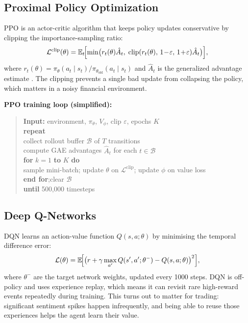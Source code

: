 \documentclass[letterpaper,twocolumn]{article}
\begin{document}
\subsection{Proximal Policy Optimization}

PPO \citep{schulman2017proximal} is an actor-critic algorithm
that keeps policy updates conservative by clipping the
importance-sampling ratio:
\begin{equation}
  \mathcal{L}^{\text{clip}}(\theta) =
    \mathbb{E}_t\!\Bigl[
      \min\bigl(
        r_t(\theta)\hat{A}_t,\;
        \mathrm{clip}(r_t(\theta),\, 1\!-\!\varepsilon,\,
                     1\!+\!\varepsilon)\hat{A}_t
      \bigr)
    \Bigr],
\end{equation}
where $r_t(\theta) = \pi_\theta(a_t\mid s_t) /
\pi_{\theta_\text{old}}(a_t\mid s_t)$ and $\hat{A}_t$ is
the generalized advantage estimate \citep{schulman2015high}.
The clipping prevents a single bad update from collapsing the
policy, which matters in a noisy financial environment.

\smallskip
\noindent\textbf{PPO training loop (simplified):}
\begin{quote}
\noindent\textbf{Input:} environment, $\pi_\theta$, $V_\phi$, clip $\varepsilon$, epochs $K$\\[1pt]
\textbf{repeat}\\[1pt]
\hspace*{1.2em}collect rollout buffer $\mathcal{B}$ of $T$ transitions\\[1pt]
\hspace*{1.2em}compute GAE advantages $\hat{A}_t$ for each $t \in \mathcal{B}$\\[1pt]
\hspace*{1.2em}\textbf{for} $k = 1$ \textbf{to} $K$ \textbf{do}\\[1pt]
\hspace*{2.4em}sample mini-batch; update $\theta$ on $\mathcal{L}^{\text{clip}}$; update $\phi$ on value loss\\[1pt]
\hspace*{1.2em}\textbf{end for};\enspace clear $\mathcal{B}$\\[1pt]
\textbf{until} 500{,}000 timesteps
\end{quote}

\subsection{Deep Q-Networks}

DQN \citep{mnih2015human} learns an action-value function
$Q(s,a;\theta)$ by minimising the temporal difference error:
\begin{equation}
  \mathcal{L}(\theta) = \mathbb{E}\!\Bigl[
    \bigl(r + \gamma \max_{a'} Q(s',a';\theta^{-})
    - Q(s,a;\theta)\bigr)^2
  \Bigr],
\end{equation}
where $\theta^{-}$ are the target network weights, updated
every 1000 steps.
DQN is off-policy and uses experience replay, which means it
can revisit rare high-reward events repeatedly during training.
This turns out to matter for trading: significant sentiment
spikes happen infrequently, and being able to reuse those
experiences helps the agent learn their value.
\end{document}
